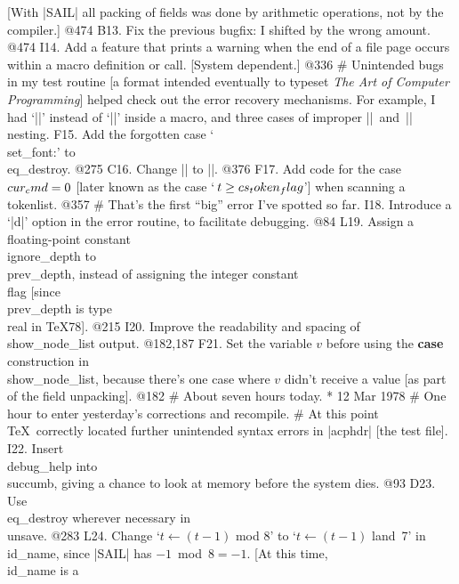 	[With |SAIL| all packing of fields was done by arithmetic operations,
	not by the compiler.] @474
B13. Fix the previous bugfix: I shifted by the wrong amount. @474
I14. Add a feature that prints a warning when the end of a file page occurs within
	a macro definition or call. [System dependent.] @336
# Unintended bugs in my test routine [a format intended eventually to typeset
	{\sl The Art of Computer Programming\/}] helped check out the
	error recovery mechanisms.
	For example, I had `|\lft{#}|' instead of `|\lft{##}|' inside a macro,
	and three cases of improper |{|~and~|}| nesting.
F15. Add the forgotten case `\\{set_font}:' to \\{eq_destroy}. @275
C16. Change |\require| to ||. @376
F17. Add code for the case $\\{cur_cmd}=0$ [later known as the case
	`$\,t\ge\\{cs_token_flag}$'] when scanning a tokenlist. @357
# That's the first ``big'' error I've spotted so far.
I18. Introduce a `|d|' option in the error routine, to facilitate debugging. @84
L19. Assign a floating-point constant \\{ignore_depth} to \\{prev_depth},
	instead of assigning the integer constant \\{flag}
	[since \\{prev_depth} is type \\{real} in \TeX78]. @215
I20. Improve the readability and spacing of \\{show_node_list} output. @182,187
F21. Set the variable $v$ before using the {\bf case} construction in
	\\{show_node_list}, because there's one case where $v$
	didn't receive a value [as part of the field unpacking]. @182
# About seven hours today.
* 12 Mar 1978
# One hour to enter yesterday's corrections and recompile.
# At this point \TeX\ correctly located further unintended syntax errors
	in |acphdr| [the test file].
I22. Insert \\{debug_help} into \\{succumb}, giving a chance to look at memory
	before the system dies. @93
D23. Use \\{eq_destroy} wherever necessary in \\{unsave}. @283
L24. Change `$t \gets  (t-1)$ mod 8' to `$t \gets  (t-1)$ land~7' in \\{id_name},
	since |SAIL| has $-1$~mod~$8 = -1$. [At this time, \\{id_name} is a
